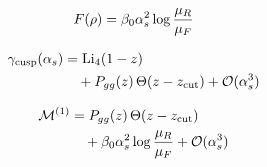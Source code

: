 \begin{equation}
  F(\rho) = \beta_0 \alpha_s^2 \log\frac{\mu_R}{\mu_F}
  \label{eq:2}
\end{equation}

\begin{align}
  \gamma_{\rm cusp}(\alpha_s) &= \mathrm{Li}_{4}(1 - z) \nonumber \\
  &\quad + P_{gg}(z) \, \Theta(z - z_{\rm cut}) + \mathcal{O}(\alpha_s^3) \label{eq:3}
\end{align}

\begin{align}
  \mathcal{M}^{(1)} &= P_{gg}(z) \, \Theta(z - z_{\rm cut}) \nonumber \\
  &\quad + \beta_0 \alpha_s^2 \log\frac{\mu_R}{\mu_F} + \mathcal{O}(\alpha_s^3) \label{eq:4}
\end{align}

